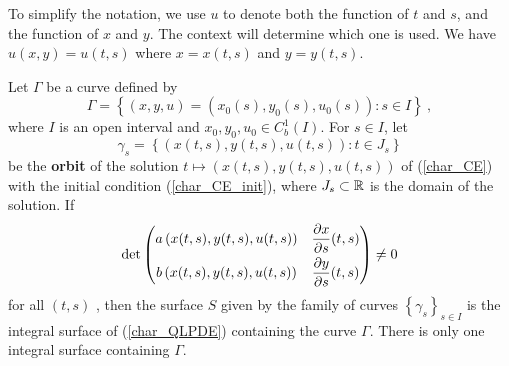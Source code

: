 To simplify the notation, we use $u$ to denote both the function of
$t$ and $s$, and the function of $x$ and $y$.  The context will
determine which one is used.  We have $u(x,y) = u(t,s)$ where
$x=x(t,s)$ and $y=y(t,s)$.


\begin{theorem}
Let $\Gamma$ be a curve defined by
\[
\Gamma = \left\{ (x,y,u) = \left(x_0(s), y_0(s),u_0(s)\right) : s \in I
\right\} \ ,
\]
where $I$ is an open interval and $\displaystyle x_0, y_0, u_0 \in C_b^1(I)$.
For $s \in I$, let
\[
\gamma_s = \left\{ \left(x(t,s), y(t,s), u(t,s) \right) : t \in J_s \right\}
\]
be the {\bfseries orbit}
of the solution $t \mapsto \left(x(t,s), y(t,s), u(t,s) \right)$ 
of (\ref{char_CE}) with the initial condition
(\ref{char_CE_init}), where $J_s \subset \mathbb{R}$ is the domain of the
solution.  If
\[
\det \begin{pmatrix}
a\left(x(t,s),y(t,s),u(t,s)\right) & \displaystyle \frac{\partial{x}}{\partial s}(t,s) \\[0.7em]
b\left(x(t,s),y(t,s),u(t,s)\right) & \displaystyle \frac{\partial{y}}{\partial s}(t,s)
\end{pmatrix} \neq 0
\]
for all $(t,s)$ \footnotemark, then the surface $S$ given by the
family of curves $\displaystyle \left\{ \gamma_s \right\}_{s\in I}$ is the
integral surface of (\ref{char_QLPDE}) containing the curve $\Gamma$.
There is only one integral surface containing $\Gamma$.
\label{qlfoPDEintsurf}
\end{theorem}



